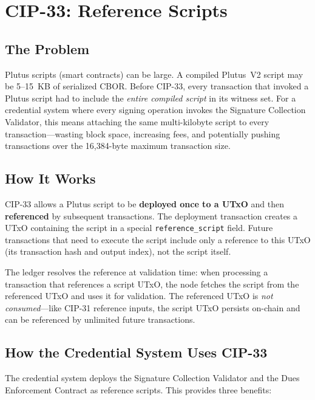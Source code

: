 \section{CIP-33: Reference Scripts}
\label{sec:cip33}

\subsection{The Problem}

Plutus scripts (smart contracts) can be large.  A compiled Plutus~V2 script
may be 5--15~KB of serialized CBOR.  Before CIP-33, every transaction that
invoked a Plutus script had to include the \emph{entire compiled script} in
its witness set.  For a credential system where every signing operation
invokes the Signature Collection Validator, this means attaching the same
multi-kilobyte script to every transaction---wasting block space, increasing
fees, and potentially pushing transactions over the 16,384-byte maximum
transaction size.

\subsection{How It Works}

CIP-33 allows a Plutus script to be \textbf{deployed once to a UTxO} and
then \textbf{referenced} by subsequent transactions.  The deployment
transaction creates a UTxO containing the script in a special
\texttt{reference\_script} field.  Future transactions that need to execute
the script include only a reference to this UTxO (its transaction hash and
output index), not the script itself.

The ledger resolves the reference at validation time: when processing a
transaction that references a script UTxO, the node fetches the script from
the referenced UTxO and uses it for validation.  The referenced UTxO is
\emph{not consumed}---like CIP-31 reference inputs, the script UTxO
persists on-chain and can be referenced by unlimited future transactions.

\subsection{How the Credential System Uses CIP-33}

The credential system deploys the Signature Collection Validator and the
Dues Enforcement Contract as reference scripts.  This provides three
benefits:

